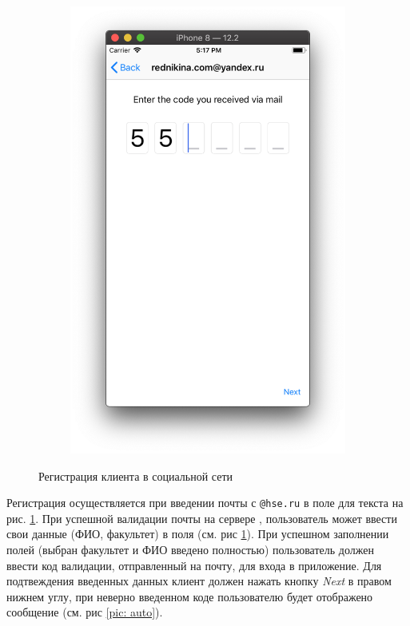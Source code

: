 \documentclass[a4paper,12pt]{article}
\begin{document}
\begin{figure}[h!]
\begin{subfigure}[b]{0.3\linewidth}
			\includegraphics[width=\linewidth]{../includes/pmi/code.png}
		\end{subfigure}
		\caption{\label{pic: register}Регистрация клиента в социальной сети}
	\end{figure}

	Регистрация осуществляется при введении почты с \verb|@hse.ru| в поле для текста на рис. \ref{pic: register}. При успешной валидации почты на сервере \cite{server}, пользователь может ввести свои данные (ФИО, факультет) в поля (см. рис \ref{pic: register}). При успешном заполнении полей (выбран факультет и ФИО введено полностью) пользователь должен ввести код валидации, отправленный на почту, для входа в приложение. Для подтвеждения введенных данных клиент должен нажать кнопку \textit{Next} в правом нижнем углу, при неверно введенном коде пользователю будет отображено сообщение (см. рис \ref{pic: auto}).
\end{document}
